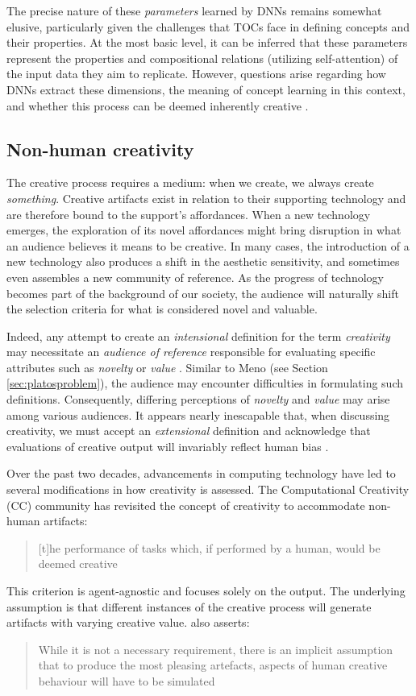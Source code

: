 The precise nature of these \emph{parameters} learned by DNNs remains somewhat elusive, particularly given the challenges that TOCs face in defining concepts and their properties. At the most basic level, it can be inferred that these parameters represent the properties and compositional relations (utilizing self-attention) of the input data they aim to replicate. However, questions arise regarding how DNNs extract these dimensions, the meaning of concept learning in this context, and whether this process can be deemed inherently creative \citep{Hoorn2023}.

\subsection{Non-human creativity}\label{sec:non-human-creativity}

The creative process requires a medium: when we create, we always create \emph{something}. Creative artifacts exist in relation to their supporting technology and are therefore bound to the support's affordances. When a new technology emerges, the exploration of its novel affordances might bring disruption in what an audience believes it means to be creative. In many cases, the introduction of a new technology also produces a shift in the aesthetic sensitivity, and sometimes even assembles a new community of reference. As the progress of technology becomes part of the background of our society, the audience will naturally shift the selection criteria for what is considered novel and valuable.

Indeed, any attempt to create an \emph{intensional} definition for the term \emph{creativity} may necessitate an \emph{audience of reference} responsible for evaluating specific attributes such as \emph{novelty} or \emph{value} \citep{Newell1959, Rhodes1961, Boden2003}. Similar to Meno (see Section \ref{sec:platosproblem}), the audience may encounter difficulties in formulating such definitions. Consequently, differing perceptions of \emph{novelty} and \emph{value} may arise among various audiences. It appears nearly inescapable that, when discussing creativity, we must accept an \emph{extensional} definition and acknowledge that evaluations of creative output will invariably reflect human bias \citep{Hoorn2023}.

Over the past two decades, advancements in computing technology have led to several modifications in how creativity is assessed. The Computational Creativity (CC) community has revisited the concept of creativity to accommodate non-human artifacts: \blockcquote[p. 451]{Wiggins2006}{[t]he performance of tasks which, if performed by a human, would be deemed creative}. This criterion is agent-agnostic and focuses solely on the output. The underlying assumption is that different instances of the creative process will generate artifacts with varying creative value. \citeauthor{Colton2008} also asserts: \blockcquote[p. 1]{Colton2008}{While it is not a necessary requirement, there is an implicit assumption that to produce the most pleasing artefacts, aspects of human creative behaviour will have to be simulated}.


